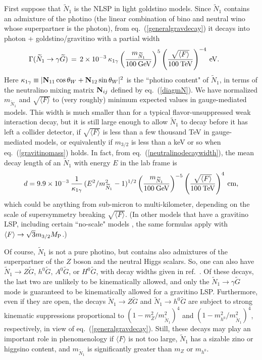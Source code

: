 \documentclass[11pt]{article}
\def\beq{\begin{eqnarray}}
\def\eeq{\end{eqnarray}}
\def\stilde{\widetilde}
\def\G{\stilde G}
\def\NI{\stilde N_1}
\def\MPlanck{M_{\rm P}}
\begin{document}
First suppose that $\stilde N_1$ is the NLSP in light goldstino models. 
Since $\stilde N_1$ contains an admixture of the photino (the linear 
combination of bino and neutral wino whose superpartner is the photon), 
from eq.~(\ref{generalgravdecay}) it decays into photon + 
goldstino/gravitino with a partial width
\beq
\Gamma (\NI \rightarrow \gamma \G ) \,=\,
2\times 10^{-3} \> \kappa_{1\gamma}\left ({m_{\NI}\over 100\>\rm{
GeV}}\right )^5
\left ( {\sqrt{\langle F \rangle}\over 100\>{\rm TeV}} \right )^{-4} \>
{\rm eV}.\qquad{}
\label{neutralinodecaywidth}
\eeq
Here $\kappa_{1\gamma} \equiv |{\bf N}_{11}\cos\theta_W + {\bf N}_{12}\sin 
\theta_W |^2$ is the ``photino content" of $\stilde N_1$, in terms of the 
neutralino mixing matrix ${\bf N}_{ij}$ defined by eq.~(\ref{diagmN}). We 
have normalized $m_{\NI}$ and $\sqrt{\langle F \rangle}$ to (very roughly) 
minimum expected values in gauge-mediated models. This width is much 
smaller than for a typical flavor-unsuppressed weak interaction decay, but 
it is still large enough to allow $\stilde N_1$ to decay before it has 
left a collider detector, if $\sqrt{\langle F\rangle}$ is less than a few 
thousand TeV in gauge-mediated models, or equivalently if $m_{3/2}$ is 
less than a keV or so when eq.~(\ref{gravitinomass}) holds. In fact, from 
eq.~(\ref{neutralinodecaywidth}), the mean decay length of an $\NI$ with 
energy $E$ in the lab frame is
\beq
d = 9.9 \times 10^{-3}\> {1\over \kappa_{1\gamma}}\,
({E^2/ m_{\NI}^2} - 1)^{1/2}
\left ({m_{\NI}\over 100\>\rm{ GeV}}\right )^{-5}
\left({\sqrt{\langle F \rangle}\over 100\>{\rm TeV}} \right )^{4}
\>{\rm cm},
\label{neutralinodecaylength}
\eeq
which could be anything from sub-micron to multi-kilometer, depending on 
the scale of supersymmetry breaking $\sqrt{\langle F \rangle}$. (In other 
models that have a gravitino LSP, including certain ``no-scale" models 
\cite{noscalephotons}, the same formulas apply with ${\langle F \rangle} 
\rightarrow \sqrt{3} m_{3/2} \MPlanck$.)

Of course, $\stilde N_1$ is not a pure photino, but contains also 
admixtures of the superpartner of the $Z$ boson and the neutral Higgs 
scalars. So, one can also have \cite{DDRT} $\NI\rightarrow Z\G$, $h^0\G$, 
$A^0\G$, or $H^0\G$, with decay widths given in ref.~\cite{AKKMM2}. Of 
these decays, the last two are unlikely to be kinematically allowed, and 
only the $\NI \rightarrow \gamma\G$ mode is guaranteed to be kinematically 
allowed for a gravitino LSP. Furthermore, even if they are open, the 
decays $\stilde N_1 \rightarrow Z\G$ and $\stilde N_1 \rightarrow h^0 \G$ 
are subject to strong kinematic suppressions proportional to 
$(1-m_Z^2/m_{\stilde N_1}^2)^4$ and $(1 - m_{h^0}^2/m_{\stilde N_1}^2)^4$, 
respectively, in view of eq.~(\ref{generalgravdecay}). Still, these decays 
may play an important role in phenomenology if ${\langle F\rangle }$ is 
not too large, $\stilde N_1$ has a sizable zino or higgsino content, and 
$m_{\stilde N_1}$ is significantly greater than $m_Z$ or $m_{h^0}$.
\end{document}
